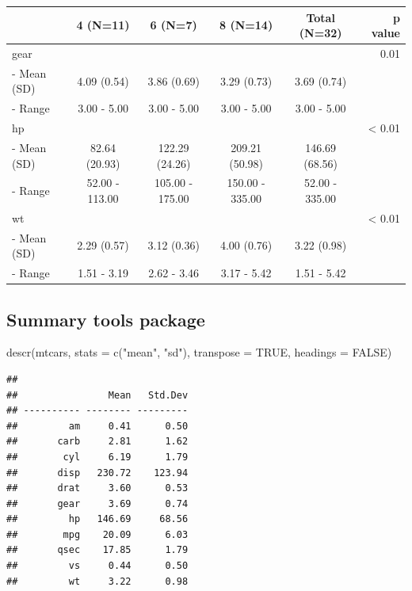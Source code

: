 \documentclass[
]{book}
\newenvironment{Shaded}{\begin{snugshade}}{\end{snugshade}}
\newcommand{\AttributeTok}[1]{\textcolor[rgb]{0.77,0.63,0.00}{#1}}
\newcommand{\ConstantTok}[1]{\textcolor[rgb]{0.00,0.00,0.00}{#1}}
\newcommand{\FunctionTok}[1]{\textcolor[rgb]{0.00,0.00,0.00}{#1}}
\newcommand{\NormalTok}[1]{#1}
\newcommand{\StringTok}[1]{\textcolor[rgb]{0.31,0.60,0.02}{#1}}
\begin{document}
\begin{longtable}[]{@{}lccccr@{}}
\toprule
& 4 (N=11) & 6 (N=7) & 8 (N=14) & Total (N=32) & p value \\
\midrule
\endhead
gear & & & & & 0.01 \\
- Mean (SD) & 4.09 (0.54) & 3.86 (0.69) & 3.29 (0.73) & 3.69 (0.74) & \\
- Range & 3.00 - 5.00 & 3.00 - 5.00 & 3.00 - 5.00 & 3.00 - 5.00 & \\
hp & & & & & \textless{} 0.01 \\
- Mean (SD) & 82.64 (20.93) & 122.29 (24.26) & 209.21 (50.98) & 146.69 (68.56) & \\
- Range & 52.00 - 113.00 & 105.00 - 175.00 & 150.00 - 335.00 & 52.00 - 335.00 & \\
wt & & & & & \textless{} 0.01 \\
- Mean (SD) & 2.29 (0.57) & 3.12 (0.36) & 4.00 (0.76) & 3.22 (0.98) & \\
- Range & 1.51 - 3.19 & 2.62 - 3.46 & 3.17 - 5.42 & 1.51 - 5.42 & \\
\bottomrule
\end{longtable}

\hypertarget{summary-tools-package}{%
\subsection{Summary tools package}\label{summary-tools-package}}

\begin{Shaded}
\begin{Highlighting}[]
\FunctionTok{descr}\NormalTok{(mtcars, }\AttributeTok{stats =} \FunctionTok{c}\NormalTok{(}\StringTok{"mean"}\NormalTok{, }\StringTok{"sd"}\NormalTok{), }\AttributeTok{transpose =} \ConstantTok{TRUE}\NormalTok{, }\AttributeTok{headings =} \ConstantTok{FALSE}\NormalTok{)}
\end{Highlighting}
\end{Shaded}

\begin{verbatim}
## 
##                Mean   Std.Dev
## ---------- -------- ---------
##         am     0.41      0.50
##       carb     2.81      1.62
##        cyl     6.19      1.79
##       disp   230.72    123.94
##       drat     3.60      0.53
##       gear     3.69      0.74
##         hp   146.69     68.56
##        mpg    20.09      6.03
##       qsec    17.85      1.79
##         vs     0.44      0.50
##         wt     3.22      0.98
\end{verbatim}
\end{document}
